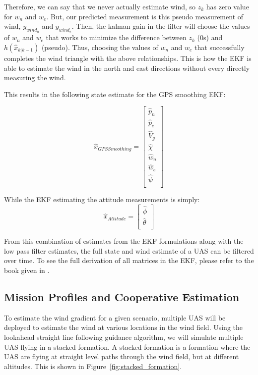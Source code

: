 Therefore, we can say that we never actually estimate wind, so $z_k$ has zero value for $w_n$ and $w_e$.
But, our predicted measurement is this pseudo measurement of wind, $y_{wind_n}$ and $y_{wind_e}$.
Then, the kalman gain in the filter will choose the values of $w_n$ and $w_e$ that works to minimize the difference between $z_k$ (0s) and $h(\hat{x}_{k|k-1})$ (pseudo).
Thus, choosing the values of $w_n$ and $w_e$ that successfully completes the wind triangle with the above relationships.
This is how the EKF is able to estimate the wind in the north and east directions without every directly measuring the wind.

This results in the following state estimate for the GPS smoothing EKF:

\begin{equation}
    \hat{x}_{GPS Smoothing} = \begin{bmatrix}
        \hat{p}_{n} \\
        \hat{p}_{e} \\
        \hat{V}_{g} \\
        \hat{\chi} \\
        \hat{w}_{n} \\
        \hat{w}_{e} \\
        \hat{\psi} \\
    \end{bmatrix}
\end{equation}

While the EKF estimating the attitude measurements is simply:
\begin{equation}
    \hat{x}_{Attitude} = \begin{bmatrix}
        \hat{\phi} \\
        \hat{\theta} \\
    \end{bmatrix}
\end{equation}

From this combination of estimates from the EKF formulations along with the low pass filter estimates, the full state and wind estimate of a UAS can be filtered over time.
To see the full derivation of all matrices in the EKF, please refer to the book given in \cite{small_uas}.

\subsection{Mission Profiles and Cooperative Estimation}

To estimate the wind gradient for a given scenario, multiple UAS will be deployed to estimate the wind at various locations in the wind field.
Using the lookahead straight line following guidance algorithm, we will simulate multiple UAS flying in a stacked formation.
A stacked formation is a formation where the UAS are flying at straight level paths through the wind field, but at different altitudes. 
This is shown in Figure~\ref{fig:stacked_formation}.

